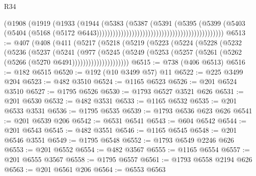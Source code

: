 \begin{lexlean}{R34}
\begin{coremodule}
                                                                        (@1908
                                                                          (@1919
                                                                            (@1933
                                                                              (@1944
                                                                                (@5383
                                                                                  (@5387
                                                                                    (@5391
                                                                                      (@5395
                                                                                        (@5399
                                                                                          (@5403
                                                                                            (@5404
                                                                                              (@5168
                                                                                                (@5172
                                                                                                  @6443)))))))))))))))))))))))))))))))))))))))))))))))
@6513 := @407
    (@408
      (@411
        (@5217
          (@5218
            (@5219
              (@5223
                (@5224
                  (@5228
                    (@5232
                      (@5236
                        (@5237
                          (@5241
                            (@977
                              (@5245
                                (@5249
                                  (@5253
                                    (@5257 (@5261 (@5262 (@5266 (@5270 @6491)))))))))))))))))))))
@6515 := @738 (@406 @6513)
@6516 := @182 @6515
@6520 := @192 (@10 @3499 @57) @11
@6522 := @225 @3499 @204
@6523 := @482 @3510
@6524 := @1165 @6523
@6526 := @201 @6524 @3510
@6527 := @1795 @6526
@6530 := @1793 @6527 @3521 @626
@6531 := @201 @6530
@6532 := @482 @3531
@6533 := @1165 @6532
@6535 := @201 @6533 @3531
@6536 := @1795 @6535
@6539 := @1793 @6536 @623 @626
@6541 := @201 @6539 @206
@6542 := @6531 @6541
@6543 := @604 @6542
@6544 := @201 @6543
@6545 := @482 @3551
@6546 := @1165 @6545
@6548 := @201 @6546 @3551
@6549 := @1795 @6548
@6552 := @1793 @6549 @2246 @626
@6553 := @201 @6552
@6554 := @482 @3567
@6555 := @1165 @6554
@6557 := @201 @6555 @3567
@6558 := @1795 @6557
@6561 := @1793 @6558 @2194 @626
@6563 := @201 @6561 @206
@6564 := @6553 @6563

\end{coremodule}
\end{lexlean}
